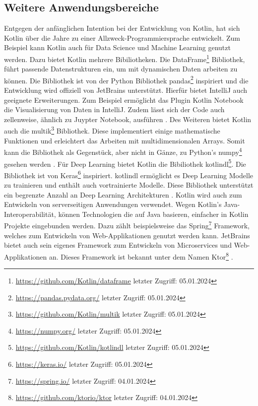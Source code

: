 \documentclass{article}
\begin{document}
\subsection{Weitere Anwendungsbereiche}
Entgegen der anfänglichen Intention bei der Entwicklung von Kotlin, hat sich Kotlin über die Jahre zu einer Allzweck-Programmiersprache entwickelt. Zum Beispiel kann Kotlin auch für Data Science und Machine Learning genutzt werden. Dazu bietet Kotlin mehrere Bibiliotheken. Die DataFrame\footnote{\url{https://github.com/Kotlin/dataframe} letzter Zugriff: 05.01.2024} Bibliothek, führt passende Datenstrukturen ein, um mit dynamischen Daten arbeiten zu können. Die Bibliothek ist von der Python Bibliothek pandas\footnote{\url{https://pandas.pydata.org/} letzter Zugriff: 05.01.2024} inspiriert und die Entwicklung wird offiziell von JetBrains unterstützt. Hierfür bietet IntelliJ auch geeignete Erweiterungen. Zum Beispiel ermöglicht das Plugin Kotlin Notebook die Visualisierung von Daten in IntelliJ. Zudem lässt sich der Code auch zellenweise, ähnlich zu Juypter Notebook, ausführen \cite{KotlinLangDocData}. \newline
Des Weiteren bietet Kotlin auch die multik\footnote{\url{https://github.com/Kotlin/multik} letzter Zugriff: 05.01.2024} Bibliothek. Diese implementiert einige mathematische Funktionen und erleichtert das Arbeiten mit multidimensionalen Arrays. Somit kann die Bibliothek als Gegenstück, aber nicht in Gänze, zu Python's numpy\footnote{\url{https://numpy.org/} letzter Zugriff: 05.01.2024} gesehen werden \cite{KotlinLangDocData}. \newline
Für Deep Learning bietet Kotlin die Bibiliothek kotlindl\footnote{\url{https://github.com/Kotlin/kotlindl} letzter Zugriff: 05.01.2024}. Die Bibliothek ist von Keras\footnote{\url{https://keras.io/} letzter Zugriff: 05.01.2024} inspiriert. kotlindl ermöglicht es Deep Learning Modelle zu trainieren und enthält auch vortrainierte Modelle. Diese Bibliothek unterstützt ein begrenzte Anzahl an Deep Learning Architekturen \cite{KotlinLangDocData}. \newline
Kotlin wird auch zum Entwickeln von serverseitigen Anwendungen verwendet. Wegen Kotlin's Java-Interoperabilität, können Technologien die auf Java basieren, einfacher in Kotlin Projekte eingebunden werden. Dazu zählt beispielsweise das Spring\footnote{\url{https://spring.io/} letzter Zugriff: 04.01.2024} Framework, welches zum Entwickeln von Web-Applikationen genutzt werden kann. JetBrains bietet auch sein eigenes Framework zum Entwickeln von Microservices und Web-Applikationen an. Dieses Framework ist bekannt unter dem Namen Ktor\footnote{\url{https://github.com/ktorio/ktor} letzter Zugriff: 04.01.2024} \cite{KotlinLangDocServer}.
\end{document}
